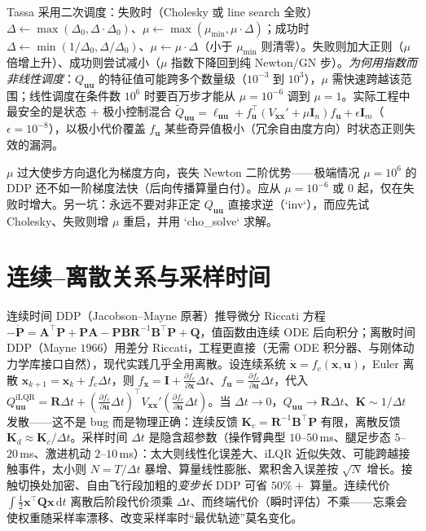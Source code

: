 Tassa 采用二次调度：失败时（Cholesky 或 line search 全败）$\Delta\leftarrow\max(\Delta_0,\Delta\cdot\Delta_0)$、$\mu\leftarrow\max(\mu_{\min},\mu\cdot\Delta)$；成功时 $\Delta\leftarrow\min(1/\Delta_0,\Delta/\Delta_0)$、$\mu\leftarrow\mu\cdot\Delta$（小于 $\mu_{\min}$ 则清零）。失败则加大正则（$\mu$ 倍增上升）、成功则尝试减小（$\mu$ 指数下降回到纯 Newton/GN 步）。\emph{为何用指数而非线性调度}：$Q_{\mathbf{uu}}$ 的特征值可能跨多个数量级（$10^{-3}$ 到 $10^3$），$\mu$ 需快速跨越该范围；线性调度在条件数 $10^6$ 时要百万步才能从 $\mu=10^{-6}$ 调到 $\mu=1$。实际工程中最安全的是状态 + 极小控制混合 $\tilde Q_{\mathbf{uu}}=\ell_{\mathbf{uu}}+f_{\mathbf{u}}^\top(V_{\mathbf{xx}}'+\mu\mathbf{I}_n)f_{\mathbf{u}}+\epsilon\mathbf{I}_m$（$\epsilon=10^{-8}$），以极小代价覆盖 $f_{\mathbf{u}}$ 某些奇异值极小（冗余自由度方向）时状态正则失效的漏洞。

\begin{pitfall}[正则化越大越安全是错觉]
$\mu$ 过大使步方向退化为梯度方向，丧失 Newton 二阶优势——极端情况 $\mu=10^6$ 的 DDP 还不如一阶梯度法快（后向传播算量白付）。应从 $\mu=10^{-6}$ 或 $0$ 起，仅在失败时增大。另一坑：永远不要对非正定 $Q_{\mathbf{uu}}$ 直接求逆（`inv`），而应先试 Cholesky、失败则增 $\mu$ 重启，并用 `cho\_solve` 求解。
\end{pitfall}

\section{连续--离散关系与采样时间}
\label{sec:ddp-cont-disc}

连续时间 DDP（Jacobson--Mayne 原著）推导微分 Riccati 方程 $-\dot{\mathbf{P}}=\mathbf{A}^\top\mathbf{P}+\mathbf{P}\mathbf{A}-\mathbf{P}\mathbf{B}\mathbf{R}^{-1}\mathbf{B}^\top\mathbf{P}+\mathbf{Q}$，值函数由连续 ODE 后向积分；离散时间 DDP（Mayne $1966$）用差分 Riccati，工程更直接（无需 ODE 积分器、与刚体动力学库接口自然），现代实践几乎全用离散。设连续系统 $\dot{\mathbf{x}}=f_c(\mathbf{x},\mathbf{u})$，Euler 离散 $\mathbf{x}_{k+1}=\mathbf{x}_k+f_c\Delta t$，则 $f_{\mathbf{x}}=\mathbf{I}+\tfrac{\partial f_c}{\partial\mathbf{x}}\Delta t$、$f_{\mathbf{u}}=\tfrac{\partial f_c}{\partial\mathbf{u}}\Delta t$，代入 $Q_{\mathbf{uu}}^{\mathrm{iLQR}}=\mathbf{R}\Delta t+(\tfrac{\partial f_c}{\partial\mathbf{u}}\Delta t)^\top V_{\mathbf{xx}}'(\tfrac{\partial f_c}{\partial\mathbf{u}}\Delta t)$。当 $\Delta t\to0$，$Q_{\mathbf{uu}}\to\mathbf{R}\Delta t$、$\mathbf{K}\sim1/\Delta t$ 发散——这不是 bug 而是物理正确：连续反馈 $\mathbf{K}_c=\mathbf{R}^{-1}\mathbf{B}^\top\mathbf{P}$ 有限，离散反馈 $\mathbf{K}_d\approx\mathbf{K}_c/\Delta t$。采样时间 $\Delta t$ 是隐含超参数（操作臂典型 $10$--$50$\,ms、腿足步态 $5$--$20$\,ms、激进机动 $2$--$10$\,ms）：太大则线性化误差大、iLQR 近似失效、可能跨越接触事件，太小则 $N=T/\Delta t$ 暴增、算量线性膨胀、累积舍入误差按 $\sqrt N$ 增长。接触切换处加密、自由飞行段加粗的\emph{变步长} DDP 可省 $50\%+$ 算量。连续代价 $\int\tfrac12\mathbf{x}^\top\mathbf{Q}\mathbf{x}\,\mathrm dt$ 离散后阶段代价须乘 $\Delta t$、而终端代价（瞬时评估）不乘——忘乘会使权重随采样率漂移、改变采样率时“最优轨迹”莫名变化。

